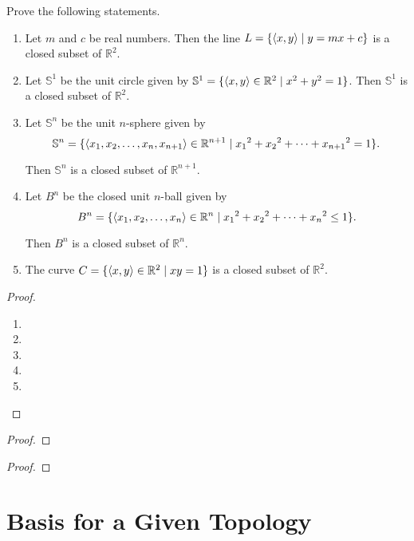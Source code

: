 \begin{exercise}
    Prove the following statements.
    \begin{enumerate}[label={(\roman*)}]
        \item Let $m$ and $c$ be real numbers. Then the line $L = \{ \left\langle{x, y}\right\rangle \mid y = mx + c \}$ is a closed subset of $\mathbb{R}^{2}$.
        \item Let $\mathbb{S}^{1}$ be the unit circle given by $\mathbb{S}^{1} = \{ \left\langle{x, y}\right\rangle\in \mathbb{R}^{2} \mid x^{2} + y^{2} = 1 \}$. Then $\mathbb{S}^{1}$ is a closed subset of $\mathbb{R}^{2}$.
        \item Let $\mathbb{S}^{n}$ be the unit $n$-sphere given by
              \[
                  \mathbb{S}^{n} = \{ \left\langle{x_{1}, x_{2}, \ldots, x_{n}, x_{n+1}}\right\rangle\in \mathbb{R}^{n+1} \mid {x_{1}}^{2} + {x_{2}}^{2} + \cdots + {x_{n+1}}^{2} = 1 \}.
              \]

              Then $\mathbb{S}^{n}$ is a closed subset of $\mathbb{R}^{n+1}$.
        \item Let $B^{n}$ be the closed unit $n$-ball given by
              \[
                  B^{n} = \{ \left\langle{x_{1}, x_{2}, \ldots, x_{n}}\right\rangle\in \mathbb{R}^{n} \mid {x_{1}}^{2} + {x_{2}}^{2} + \cdots + {x_{n}}^{2} \leq 1 \}.
              \]

              Then $B^{n}$ is a closed subset of $\mathbb{R}^{n}$.
        \item The curve $C = \{ \left\langle{x, y}\right\rangle\in \mathbb{R}^{2} \mid xy = 1 \}$ is a closed subset of $\mathbb{R}^{2}$.
    \end{enumerate}
\end{exercise}

\begin{proof}
    \begin{enumerate}[label={(\roman*)}]
        \item
        \item
        \item
        \item
        \item
    \end{enumerate}
\end{proof}
\newpage

\begin{exercise}
\end{exercise}

\begin{proof}
\end{proof}
\newpage

\begin{exercise}
\end{exercise}

\begin{proof}
\end{proof}
\newpage

\section{Basis for a Given Topology}
